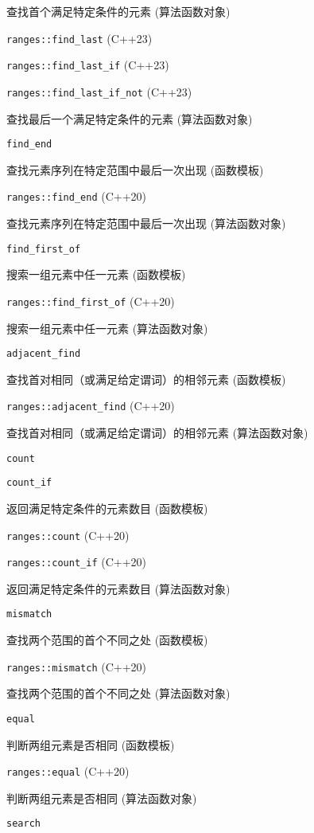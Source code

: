 查找⾸个满⾜特定条件的元素 (算法函数对象)

\noindent \lstinline{ranges::find_last} (C++23)

\noindent \lstinline{ranges::find_last_if} (C++23)

\noindent \lstinline{ranges::find_last_if_not} (C++23)

查找最后⼀个满⾜特定条件的元素 (算法函数对象)

\noindent \lstinline{find_end}

查找元素序列在特定范围中最后⼀次出现 (函数模板)

\noindent \lstinline{ranges::find_end} (C++20)

查找元素序列在特定范围中最后⼀次出现 (算法函数对象)

\noindent \lstinline{find_first_of} 

搜索⼀组元素中任⼀元素 (函数模板)

\noindent \lstinline{ranges::find_first_of} (C++20)

搜索⼀组元素中任⼀元素 (算法函数对象)

\noindent \lstinline{adjacent_find}

查找⾸对相同（或满⾜给定谓词）的相邻元素 (函数模板)

\noindent \lstinline{ranges::adjacent_find} (C++20) 

查找⾸对相同（或满⾜给定谓词）的相邻元素 (算法函数对象)

\noindent \lstinline{count}

\noindent \lstinline{count_if}

返回满⾜特定条件的元素数⽬ (函数模板)

\noindent \lstinline{ranges::count} (C++20)

\noindent \lstinline{ranges::count_if} (C++20)

返回满⾜特定条件的元素数⽬ (算法函数对象)


\noindent \lstinline{mismatch}

查找两个范围的⾸个不同之处 (函数模板)

\noindent \lstinline{ranges::mismatch} (C++20)

查找两个范围的⾸个不同之处 (算法函数对象)

\noindent \lstinline{equal}

判断两组元素是否相同 (函数模板)

\noindent \lstinline{ranges::equal} (C++20)

判断两组元素是否相同 (算法函数对象)

\noindent \lstinline{search}

